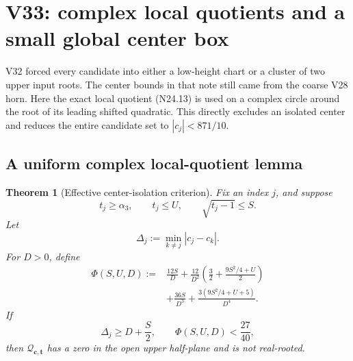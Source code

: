 \documentclass[11pt]{article}
\newtheorem{theorem}{Theorem}[section]
\theoremstyle{definition}
\theoremstyle{remark}
\begin{document}



\section{V33: complex local quotients and a small global center box}
\label{sec:f2v33-center-box}

V32 forced every candidate into either a low-height chart or a cluster of
two upper input roots.  The center bounds in that note still came from the
coarse V28 horn.  Here the exact local quotient \textup{(N24.13)} is used
on a complex circle around the root of its leading shifted quadratic.
This directly excludes an isolated center and reduces the entire candidate
set to \(|c_j|<871/10\).

\subsection{A uniform complex local-quotient lemma}

\begin{theorem}[Effective center-isolation criterion]
\label{thm:f2v33-center-isolation}
Fix an index \(j\), and suppose
\[
 t_j\geq\alpha_3,\qquad t_j\leq U,\qquad
 \sqrt{t_j-1}\leq S.
 \tag{N33.1}
\]
Let
\[
 \Delta_j:=\min_{k\ne j}|c_j-c_k|.
 \tag{N33.2}
\]
For \(D>0\), define
\[
\begin{aligned}
 \Phi(S,U,D):={}&
 \frac{12S}{D}
 +\frac{12}{D^2}
  \left(\frac32+\frac{9S^2/4+U}{2}\right)\\
 &+\frac{36S}{D^3}
 +\frac{3(9S^2/4+U+5)}{D^4}.
\end{aligned}
\tag{N33.3}
\]
If
\[
 \Delta_j\geq D+\frac S2,\qquad
 \Phi(S,U,D)<\frac{27}{40},
 \tag{N33.4}
\]
then \(\mathcal Q_{\bm c,\bm t}\) has a zero in the open upper
half-plane and is not real-rooted.
\end{theorem}
\end{document}
